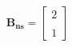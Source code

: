 \documentclass[preview]{standalone}
\begin{document}
\begin{align*}
\mathbf{B_{ns}} = \begin{bmatrix} 2  \\ \\ 1 \end{bmatrix}
\end{align*}
\end{document}

